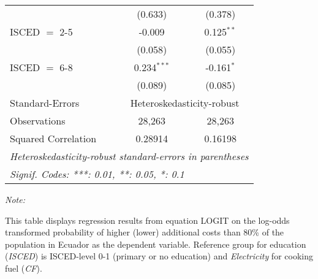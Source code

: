 \begin{table}[htbp!]
\begin{adjustbox}{width = 1\textwidth, max height = 0.95\textheight, center}
\begin{threeparttable}[b]
\begin{tabular}{lcc}
                                 & (0.633)        & (0.378)\\   
            ISCED $=$ 2-5        & -0.009         & 0.125$^{**}$\\   
                                 & (0.058)        & (0.055)\\   
            ISCED $=$ 6-8        & 0.234$^{***}$  & -0.161$^{*}$\\   
                                 & (0.089)        & (0.085)\\   
            \midrule 
            Standard-Errors & \multicolumn{2}{c}{Heteroskedasticity-robust} \\ 
            Observations         & 28,263         & 28,263\\  
            Squared Correlation  & 0.28914        & 0.16198\\  
            \midrule \midrule
            \multicolumn{3}{l}{\emph{Heteroskedasticity-robust standard-errors in parentheses}}\\
            \multicolumn{3}{l}{\emph{Signif. Codes: ***: 0.01, **: 0.05, *: 0.1}}\\
         \end{tabular}
         
         \begin{tablenotes}\item \medskip \textit{Note:}
            \item This table displays regression results from equation LOGIT on the log-odds transformed probability of higher (lower) additional costs than 80\% of the population in Ecuador as the dependent variable. Reference group for education (\textit{ISCED}) is ISCED-level 0-1 (primary or no education) and \textit{Electricity} for cooking fuel (\textit{CF}).
         \end{tablenotes}
      \end{threeparttable}
   \end{adjustbox}
\end{table}


